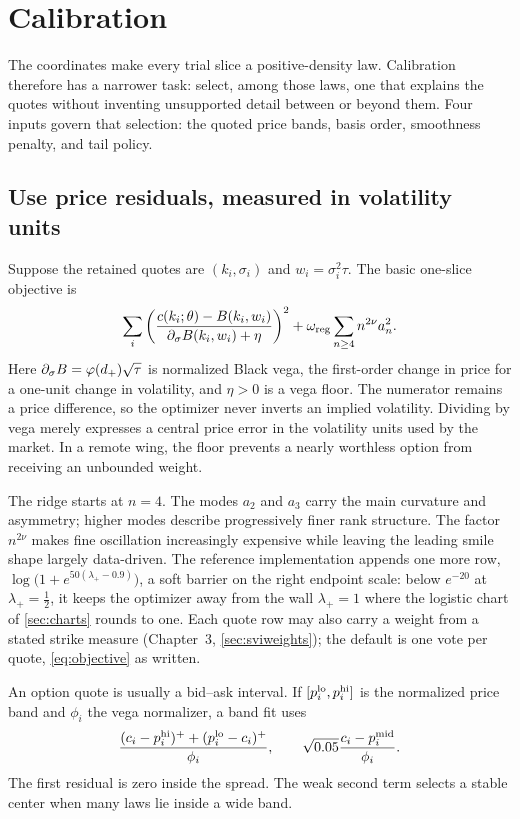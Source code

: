 \section{Calibration}
\label{sec:calibration}

The coordinates make every trial slice a positive-density law.  Calibration
therefore has a narrower task: select, among those laws, one that explains the
quotes without inventing unsupported detail between or beyond them.  Four
inputs govern that selection: the quoted price bands, basis order, smoothness
penalty, and tail policy.

\subsection{Use price residuals, measured in volatility units}

Suppose the retained quotes are $(k_i,\sigma_i)$ and
$w_i=\sigma_i^2\tau$.  The basic one-slice objective is
\begin{equation}
\sum_i\left(
\frac{c(k_i;\theta)-B(k_i,w_i)}
{\partial_\sigma B(k_i,w_i)+\eta}
\right)^2
+\omega_{\rm reg}\sum_{n\ge4}n^{2\nu}a_n^2.
\label{eq:objective}
\end{equation}
Here $\partial_\sigma B=\varphi(d_+)\sqrt\tau$ is normalized Black vega,
the first-order change in price for a one-unit change in volatility, and
$\eta>0$ is a vega floor.  The numerator remains a price difference, so the
optimizer never inverts an implied volatility.  Dividing by vega merely
expresses a central price error in the volatility units used by the market.
In a remote wing, the floor prevents a nearly worthless option from receiving
an unbounded weight.

The ridge starts at $n=4$.  The modes $a_2$ and $a_3$ carry the main
curvature and asymmetry; higher modes describe progressively finer rank
structure.  The factor $n^{2\nu}$ makes fine oscillation increasingly
expensive while leaving the leading smile shape largely data-driven.
The reference implementation appends one more row,
$\log\!\big(1+e^{50(\lambda_+-0.9)}\big)$, a soft barrier on the right
endpoint scale: below $e^{-20}$ at $\lambda_+=\tfrac12$, it keeps the
optimizer away from the wall $\lambda_+=1$ where the logistic chart of
\cref{sec:charts} rounds to one.  Each quote row may also carry a
weight from a stated strike measure (Chapter~3,
\cref{sec:sviweights}); the default is one vote per quote,
\eqref{eq:objective} as written.

An option quote is usually a bid--ask interval.  If
$[p_i^{\rm lo},p_i^{\rm hi}]$ is the normalized price band and $\phi_i$ the
vega normalizer, a band fit uses
\begin{equation}
\frac{(c_i-p_i^{\rm hi})^++(p_i^{\rm lo}-c_i)^+}{\phi_i},
\qquad
\sqrt{0.05}\frac{c_i-p_i^{\rm mid}}{\phi_i}.
\label{eq:band}
\end{equation}
The first residual is zero inside the spread.  The weak second term selects a
stable center when many laws lie inside a wide band.

